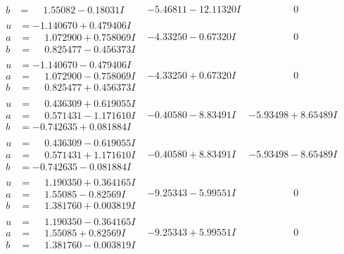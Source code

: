 \documentclass[1p]{elsarticle_modified}
\theoremstyle{definition}
\begin{document}
$$\begin{array}{c|c|c}
\begin{aligned}
b &= \phantom{-}1.55082 - 0.18031 I\end{aligned}
 & -5.46811 - 12.11320 I & \phantom{-0.000000 } 0 \\ \hline\begin{aligned}
u &= -1.140670 + 0.479406 I \\
a &= \phantom{-}1.072900 + 0.758069 I \\
b &= \phantom{-}0.825477 - 0.456373 I\end{aligned}
 & -4.33250 - 0.67320 I & \phantom{-0.000000 } 0 \\ \hline\begin{aligned}
u &= -1.140670 - 0.479406 I \\
a &= \phantom{-}1.072900 - 0.758069 I \\
b &= \phantom{-}0.825477 + 0.456373 I\end{aligned}
 & -4.33250 + 0.67320 I & \phantom{-0.000000 } 0 \\ \hline\begin{aligned}
u &= \phantom{-}0.436309 + 0.619055 I \\
a &= \phantom{-}0.571431 - 1.171610 I \\
b &= -0.742635 + 0.081884 I\end{aligned}
 & -0.40580 - 8.83491 I & -5.93498 + 8.65489 I \\ \hline\begin{aligned}
u &= \phantom{-}0.436309 - 0.619055 I \\
a &= \phantom{-}0.571431 + 1.171610 I \\
b &= -0.742635 - 0.081884 I\end{aligned}
 & -0.40580 + 8.83491 I & -5.93498 - 8.65489 I \\ \hline\begin{aligned}
u &= \phantom{-}1.190350 + 0.364165 I \\
a &= \phantom{-}1.55085 - 0.82569 I \\
b &= \phantom{-}1.381760 + 0.003819 I\end{aligned}
 & -9.25343 - 5.99551 I & \phantom{-0.000000 } 0 \\ \hline\begin{aligned}
u &= \phantom{-}1.190350 - 0.364165 I \\
a &= \phantom{-}1.55085 + 0.82569 I \\
b &= \phantom{-}1.381760 - 0.003819 I\end{aligned}
 & -9.25343 + 5.99551 I & \phantom{-0.000000 } 0 \\ \hline\begin{aligned}

\end{aligned}
\end{array}$$
\end{document}
